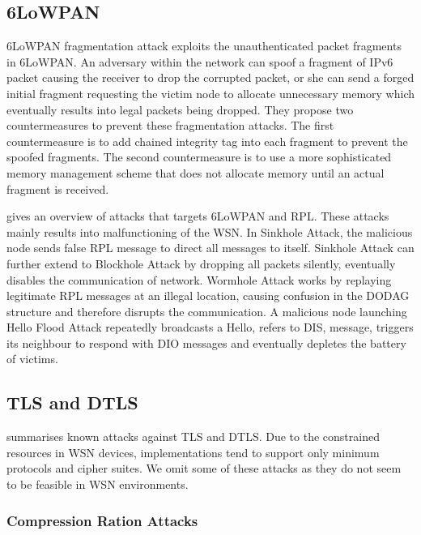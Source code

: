 \subsection{6LoWPAN}
6LoWPAN fragmentation attack\cite{6lpFragAtk} exploits the unauthenticated packet fragments in 6LoWPAN. An adversary within the network can spoof a fragment of IPv6 packet causing the receiver to drop the corrupted  packet, or she can send a forged initial fragment requesting the victim node to allocate unnecessary memory which eventually results into legal packets being dropped. They propose two countermeasures to prevent these fragmentation attacks. The first countermeasure is to add chained integrity tag into each fragment to prevent the spoofed fragments. The second countermeasure is to use a more sophisticated memory management scheme that does not allocate memory until an actual fragment is received.

\cite{6lpRplAtk} gives an overview of attacks that targets 6LoWPAN and RPL. These attacks mainly results into malfunctioning of the WSN. In Sinkhole Attack\cite{Sinkhole}, the malicious node sends false RPL message to direct all messages to itself. Sinkhole Attack can further extend to Blockhole Attack\cite{Blackhole} by dropping all packets silently, eventually disables the communication of network. Wormhole Attack\cite{Wormhole} works by replaying legitimate RPL messages at an illegal location, causing confusion in the DODAG structure and therefore disrupts the communication. A malicious node launching Hello Flood Attack repeatedly broadcasts a Hello, refers to DIS, message, triggers its neighbour to respond with DIO messages and eventually depletes the battery of victims.

\subsection{TLS and DTLS}
\cite{rfc7457} summarises known attacks  against TLS and DTLS. Due to the constrained resources in WSN devices, implementations tend to support only  minimum protocols and cipher suites. We omit some of these attacks as they do not seem to be feasible in WSN environments.

\subsubsection{Compression Ration Attacks}

